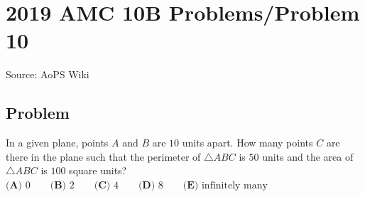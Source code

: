 \documentclass[12pt]{article}
\begin{document}
\section*{{2019 AMC 10B Problems/Problem 10}}
Source: AoPS Wiki

\subsection*{Problem}
In a given plane, points $A$ and $B$ are $10$ units apart. How many points $C$ are there in the plane such that the perimeter of $\triangle ABC$ is $50$ units and the area of $\triangle ABC$ is $100$ square units? $\textbf{(A) }0\qquad\textbf{(B) }2\qquad\textbf{(C) }4\qquad\textbf{(D) }8\qquad\textbf{(E) }\text{infinitely many}$
\end{document}
